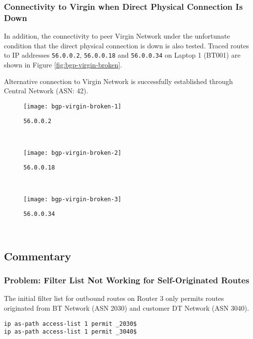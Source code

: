 \subsubsection{Connectivity to Virgin when Direct Physical Connection Is Down}
In addition, the connectivity to peer Virgin Network under the unfortunate condition that the direct physical connection is down is also tested. 
Traced routes to IP addresses \texttt{56.0.0.2}, \texttt{56.0.0.18} and \texttt{56.0.0.34} on Laptop 1 (BT001) are shown in Figure \ref{fig:bgp-virgin-broken}.

Alternative connection to Virgin Network is successfully established through Central Network (ASN: 42).

\begin{figure*}[ht!]
    \centering
    \begin{subfigure}[b]{\textwidth}
        \centering
        \texttt{[image: bgp-virgin-broken-1]}
        \caption{\texttt{56.0.0.2}}
    \end{subfigure}
    ~
    \begin{subfigure}[b]{\textwidth}
        \centering
        \texttt{[image: bgp-virgin-broken-2]}
        \caption{\texttt{56.0.0.18}}
    \end{subfigure}
    ~
    \begin{subfigure}[b]{\textwidth}
        \centering
        \texttt{[image: bgp-virgin-broken-3]}
        \caption{\texttt{56.0.0.34}}
    \end{subfigure}
    ~
    \caption{Tracing IPv4 Routes to Virgin Network on Laptop 1 (BT001) using \texttt{traceroute} When Direct Physical Connection Is Broken .}
    \label{fig:bgp-virgin-broken}
\end{figure*}


\subsection{Commentary}

\subsubsection{Problem: Filter List Not Working for Self-Originated Routes}

The initial filter list for outbound routes on Router 3 only permits routes originated from BT Network (ASN 2030) and customer DT Network (ASN 3040).

\begin{lstlisting}
ip as-path access-list 1 permit _2030$
ip as-path access-list 1 permit _3040$
\end{lstlisting}

